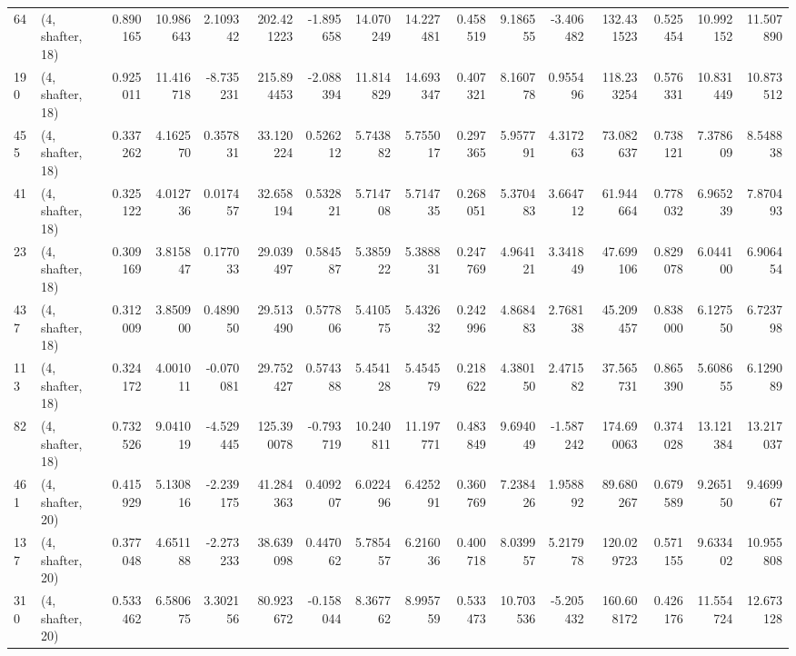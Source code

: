 \begin{tabular}{llrrrrrrrrrrrrrr}
64  &  (4, shafter, 18) &   0.890165 &  10.986643 &   2.109342 &   202.421223 &  -1.895658 &  14.070249 &  14.227481 &  0.458519 &   9.186555 &  -3.406482 &   132.431523 &   0.525454 &  10.992152 &  11.507890 \\
190 &  (4, shafter, 18) &   0.925011 &  11.416718 &  -8.735231 &   215.894453 &  -2.088394 &  11.814829 &  14.693347 &  0.407321 &   8.160778 &   0.955496 &   118.233254 &   0.576331 &  10.831449 &  10.873512 \\
455 &  (4, shafter, 18) &   0.337262 &   4.162570 &   0.357831 &    33.120224 &   0.526212 &   5.743882 &   5.755017 &  0.297365 &   5.957791 &   4.317263 &    73.082637 &   0.738121 &   7.378609 &   8.548838 \\
41  &  (4, shafter, 18) &   0.325122 &   4.012736 &   0.017457 &    32.658194 &   0.532821 &   5.714708 &   5.714735 &  0.268051 &   5.370483 &   3.664712 &    61.944664 &   0.778032 &   6.965239 &   7.870493 \\
23  &  (4, shafter, 18) &   0.309169 &   3.815847 &   0.177033 &    29.039497 &   0.584587 &   5.385922 &   5.388831 &  0.247769 &   4.964121 &   3.341849 &    47.699106 &   0.829078 &   6.044100 &   6.906454 \\
437 &  (4, shafter, 18) &   0.312009 &   3.850900 &   0.489050 &    29.513490 &   0.577806 &   5.410575 &   5.432632 &  0.242996 &   4.868483 &   2.768138 &    45.209457 &   0.838000 &   6.127550 &   6.723798 \\
113 &  (4, shafter, 18) &   0.324172 &   4.001011 &  -0.070081 &    29.752427 &   0.574388 &   5.454128 &   5.454579 &  0.218622 &   4.380150 &   2.471582 &    37.565731 &   0.865390 &   5.608655 &   6.129089 \\
82  &  (4, shafter, 18) &   0.732526 &   9.041019 &  -4.529445 &   125.390078 &  -0.793719 &  10.240811 &  11.197771 &  0.483849 &   9.694049 &  -1.587242 &   174.690063 &   0.374028 &  13.121384 &  13.217037 \\
461 &  (4, shafter, 20) &   0.415929 &   5.130816 &  -2.239175 &    41.284363 &   0.409207 &   6.022496 &   6.425291 &  0.360769 &   7.238426 &   1.958892 &    89.680267 &   0.679589 &   9.265150 &   9.469967 \\
137 &  (4, shafter, 20) &   0.377048 &   4.651188 &  -2.273233 &    38.639098 &   0.447062 &   5.785457 &   6.216036 &  0.400718 &   8.039957 &   5.217978 &   120.029723 &   0.571155 &   9.633402 &  10.955808 \\
310 &  (4, shafter, 20) &   0.533462 &   6.580675 &   3.302156 &    80.923672 &  -0.158044 &   8.367762 &   8.995759 &  0.533473 &  10.703536 &  -5.205432 &   160.608172 &   0.426176 &  11.554724 &  12.673128 \\

\end{tabular}
